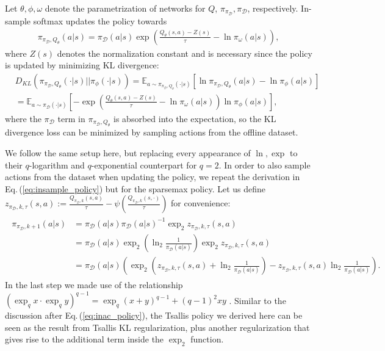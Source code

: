 \documentclass{article}
\newcommand{\AdaBracket}[1]{\left(#1\right)}
\newcommand{\AdaRectBracket}[1]{\left[#1\right]}
\newcommand{\expectation}[2]{\mathbb{E}_{#1}\AdaRectBracket{#2}}
\newcommand{\qlog}{$q$-logarithm }
\newcommand{\KLany}[2]{D_{\!K\!L}\!\left(#1 \left|  \right| #2 \right)}
\newcommand{\expq}[1]{\exp_{q}\!#1}
\newcommand{\eq}[1]{Eq.\,(#1)}
\newcommand{\datasetPolicy}{\pi_{\mathcal{D}}}
\begin{document}
Let $\theta, \phi, \omega$ denote the parametrization of networks for $Q$, $\pi_{\datasetPolicy}, \datasetPolicy$, respectively.
In-sample softmax updates the policy towards 
\begin{align}
    \pi_{\datasetPolicy, Q_{\theta}}(a|s) = \datasetPolicy(a|s)\exp\AdaBracket{\frac{Q_{\theta}(s,a) - Z(s)}{\tau} - \ln \pi_{\omega}(a|s)},
    \label{eq:insample_policy}
\end{align}
where $Z(s)$ denotes the normalization constant and is necessary since the policy is updated by minimizing KL divergence:
\begin{align*}
    &\KLany{\pi_{\datasetPolicy, Q_{\theta}}(\cdot|s)}{\pi_{\phi}(\cdot | s)} = \expectation{a \sim \pi_{\datasetPolicy, Q_{\theta}}(\cdot|s) }{\ln \pi_{\datasetPolicy, Q_{\theta}}(a|s) - \ln \pi_{\phi}(a | s)} \\
    &= \expectation{a \sim \datasetPolicy(\cdot|s)}{ - \exp\AdaBracket{\frac{Q_{\theta}(s,a) - Z(s)}{\tau} - \ln \pi_{\omega}(a|s)} \ln\pi_{\phi}(a|s) },
\end{align*} 
where the $\datasetPolicy$ term in $ \pi_{\datasetPolicy, Q_{\theta}}$ is absorbed into the expectation, so the KL divergence loss can be minimized by sampling actions from the offline dataset.

We follow the same setup here, but replacing every appearance of $\ln, \exp$ to their \qlog and $q$-exponential counterpart for $q=2$.
In order to also sample actions from the dataset when updating the policy, we repeat the derivation in \eq{\ref{eq:insample_policy}} but for the sparsemax policy.
Let us define $z_{\datasetPolicy, k, \tau}(s,a) := \frac{Q_{\datasetPolicy, k}(s,a)}{\tau} - \psi\AdaBracket{\frac{Q_{\datasetPolicy, k}(s,\cdot)}{\tau}}$ for convenience:
\begin{align}
    \begin{split}
        \pi_{\datasetPolicy, k+1} (a|s) &= \datasetPolicy(a|s) \datasetPolicy(a|s)^{-1} \exp_2{z_{\datasetPolicy, k, \tau}(s,a)} \\
        &= \datasetPolicy(a|s)  \exp_2{\AdaBracket{\ln_2{\frac{1}{\datasetPolicy(a|s)}}}} \exp_2{z_{\datasetPolicy, k, \tau}(s,a)}\\
        &=  \datasetPolicy(a|s) \AdaBracket{ \exp_2\AdaBracket{z_{\datasetPolicy, k, \tau}(s,a) + \ln_2\frac{1}{\datasetPolicy(a|s)}} -  z_{\datasetPolicy, k, \tau}(s,a)  \ln_2{\frac{1}{\datasetPolicy(a|s)}} }.
        \label{eq:tsallis_inac_policy}
    \end{split}
\end{align}
In the last step we made use of the relationship $\AdaBracket{\expq{x}\cdot \expq{y}}^{q-1} = \expq{\AdaBracket{x+y}}^{q-1} + (q-1)^2 xy$ \cite{Yamano2004-properties-qlogexp}.
Similar to the discussion after \eq{\ref{eq:inac_policy}}, the Tsallis policy we derived here can be seen as the result from Tsallis KL regularization, plus another regularization that gives rise to the additional term inside the $\exp_2$ function.
\end{document}
